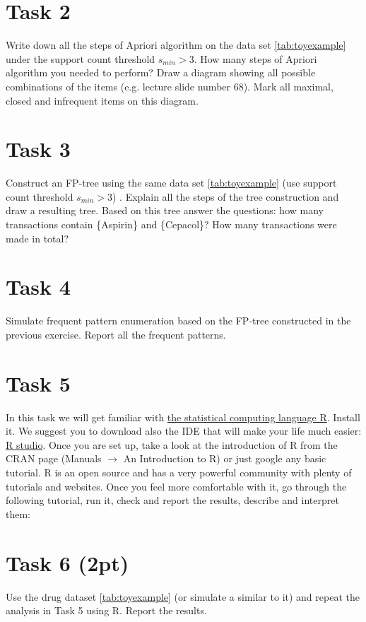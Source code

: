 \documentclass{article}
\begin{document}
\section*{Task 2}
Write down all the steps of Apriori algorithm on the data set \ref{tab:toyexample} under the support count threshold $s_{min} > 3$. How many steps of Apriori algorithm you needed to perform? Draw a diagram showing all possible combinations of the items (e.g. lecture slide number 68). Mark all maximal, closed and infrequent items on this diagram.

\section*{Task 3}
Construct an FP-tree using the same data set \ref{tab:toyexample} (use support count  threshold $s_{min} > 3$) . Explain all the steps of the tree construction and draw a resulting tree. Based on this tree answer the questions: how many transactions contain \{Aspirin\} and \{Cepacol\}? How many transactions were made in total?


\section*{Task 4}
Simulate frequent pattern enumeration based on the FP-tree constructed in the previous exercise. Report all the frequent patterns. 
 
\section*{Task 5}
In this task we will get familiar with \href{http://www.r-project.org/}{the statistical computing language R}. Install it. We suggest you to download also the IDE that will make your life much easier: \href{https://www.rstudio.com/}{R studio}. Once you are set up, take a look at the introduction of R from the CRAN page (Manuals $\rightarrow$ An Introduction to R) or just google any basic tutorial. R is an open source and has a very powerful community with plenty of tutorials and websites. Once you feel more comfortable with it, go through the following tutorial, run it, check and report the results, describe and interpret them:


\section*{Task 6 (2pt)}
Use the drug dataset \ref{tab:toyexample} (or simulate a similar to it) and repeat the analysis in Task 5 using R. Report the results.
\end{document}
